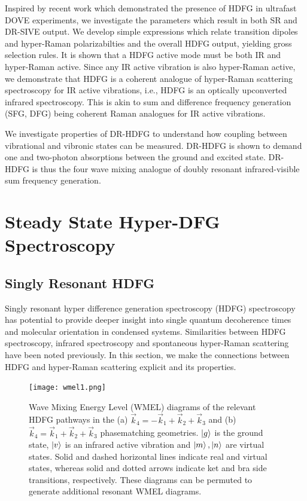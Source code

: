 \documentclass[aip, jcp, reprint, onecolumn]{revtex4-2}
\begin{document}
Inspired by recent work which demonstrated the presence of HDFG in ultrafast DOVE experiments,\cite{McDonnell2024} we investigate the parameters which result in both SR and DR-SIVE output. \cite{Cho2000, Bonn2024}
We develop simple expressions which relate transition dipoles and hyper-Raman polarizabilties and the overall HDFG output, yielding gross selection rules. 
It is shown that a HDFG active mode must be both IR and hyper-Raman active.
Since any IR active vibration is also hyper-Raman active, \cite{Andrews1978} we demonstrate that HDFG is a coherent analogue of hyper-Raman scattering spectroscopy for IR active vibrations, i.e., HDFG is an optically upconverted infrared spectroscopy.
This is akin to sum and difference frequency generation (SFG, DFG) being coherent Raman analogues for IR active vibrations. \cite{Shen90}

We investigate properties of DR-HDFG to understand how coupling between vibrational and vibronic states can be measured.
DR-HDFG is shown to demand one and two-photon absorptions between the ground and excited state.
DR-HDFG is thus the four wave mixing analogue of doubly resonant infrared-visible sum frequency generation. \cite{Shen94}

\section{Steady State Hyper-DFG Spectroscopy}
\subsection{Singly Resonant HDFG}
Singly resonant hyper difference generation spectroscopy (HDFG) spectroscopy has potential to provide deeper insight into single quantum decoherence times and molecular orientation in condensed systems.
Similarities between HDFG spectroscopy, infrared spectroscopy and spontaneous hyper-Raman scattering have been noted previously. \cite{RN352, Bonn2024}
In this section, we make the connections between HDFG and hyper-Raman scattering explicit and its properties.

\begin{figure}[!htbp]
	\centering
	\texttt{[image: wmel1.png]}
	\caption{Wave Mixing Energy Level (WMEL) diagrams of the relevant HDFG pathways in the (a) $\vec{k}_4 = -\vec{k}_1 + \vec{k}_2 + \vec{k}_3$ and (b) $\vec{k}_4 = \vec{k}_1 + \vec{k}_2 + \vec{k}_3$ phasematching geometries. \cite{RN286, RN352}
	$\ket{g}$ is the ground state, $\ket{v}$ is an infrared active vibration and $\ket{m}, \ket{n}$ are virtual states.
	Solid and dashed horizontal lines indicate real and virtual states, whereas solid and dotted arrows indicate ket and bra side transitions, respectively. 
	These diagrams can be permuted to generate additional resonant WMEL diagrams.}
	\label{fig:sivewmel}
\end{figure}
\end{document}
